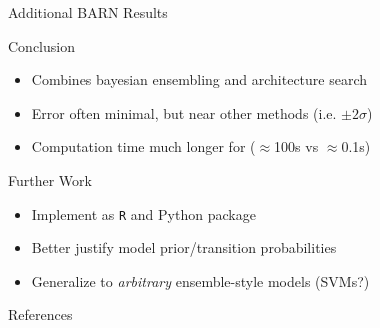 \documentclass{beamer}
\begin{document}
\begin{frame}
\begin{columns}
\begin{column}{.33\textwidth}
\begin{minipage}{.98\textwidth}
{\begin{myblock}{Additional BARN Results}
		\end{myblock}
			\begin{myblock}{Conclusion}
\begin{itemize}
\item Combines bayesian ensembling and architecture search
\item Error often minimal, but near other methods (i.e. $\pm 2\sigma$)
\item Computation time much longer for ($\approx$100s vs $\approx$0.1s)
\end{itemize}
		\end{myblock}
			\begin{myblock}{Further Work}
\begin{itemize}
\item Implement as \texttt{R} and Python package
\item Better justify model prior/transition probabilities
\item Generalize to \emph{arbitrary} ensemble-style models (SVMs?)
\end{itemize}
		\end{myblock}
		\begin{myblock}{References}
			\footnotesize
			
			
		\end{myblock}
		\vfill
		}
	\end{minipage}
	\end{column}
\end{columns}
\end{frame}
\end{document}
